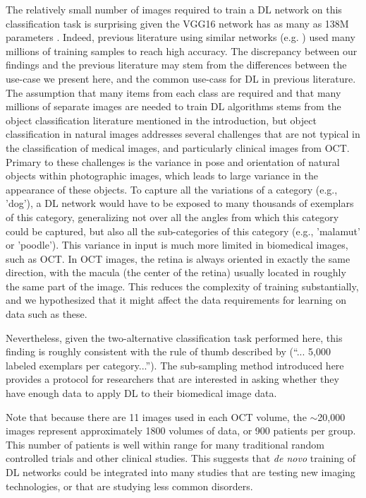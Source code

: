 The relatively small number  of images required to train a DL network on this
classification task is surprising given the VGG16 network has as many as 138M
parameters \citep{Canziani2016-ps}. Indeed, previous literature using similar
networks (e.g. \citep{Krizhevsky2012-az, Simonyan2014-al}) used many millions of
training samples to reach high accuracy. The discrepancy between our findings
and the previous literature may stem from the differences between the use-case
we present here, and the common use-cass for DL in previous literature. The
assumption that many items from each class are required and that many millions
of separate images are needed to train DL algorithms stems from the object
classification literature mentioned in the introduction, but object
classification in natural images addresses several challenges that are not
typical  in the classification of medical images, and particularly clinical
images from OCT. Primary to these challenges is the variance in pose and
orientation of natural objects within photographic images, which leads to large
variance in the appearance of these objects. To capture all the variations of a
category (e.g., 'dog'), a DL network would have to be exposed to many thousands
of exemplars of this category, generalizing not over all the angles from which
this category could be captured, but also all the sub-categories of this
category (e.g., 'malamut' or 'poodle'). This variance in input is much more
limited in biomedical images, such as OCT. In OCT images, the retina is always
oriented in exactly the same direction, with the macula (the center of the
retina) usually located in roughly the same part of the image. This reduces the
complexity of training substantially, and we hypothesized that it might affect
the data requirements for learning on data such as these.

Nevertheless, given the two-alternative classification task performed here, this
finding is roughly consistent with the rule of thumb described by
\citep{Goodfellow-et-al-2016}(``... 5,000 labeled exemplars per category...'').
The sub-sampling method introduced here provides a protocol for researchers that
are interested in asking whether they have enough data to apply DL to their
biomedical image data.

Note that because there are 11 images used in each OCT volume, the $\sim$20,000
images represent approximately 1800 volumes of data, or 900 patients per group.
This number of patients is well within range for many traditional random
controlled trials and other clinical studies. This suggests that \emph{de novo}
training of DL networks could be integrated into many studies that are testing
new imaging technologies, or that are studying less common disorders.

